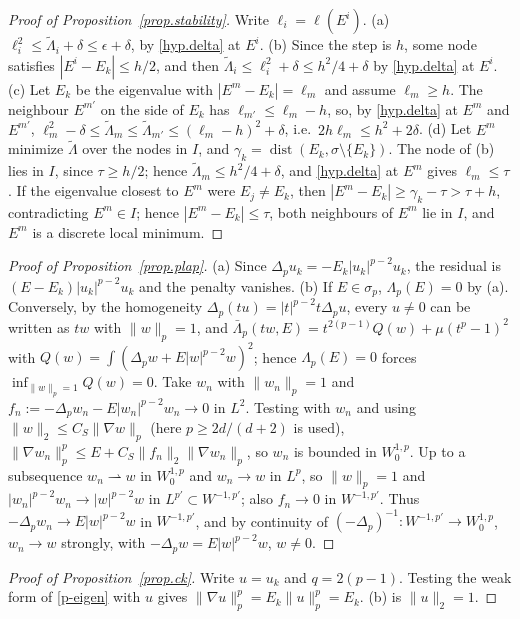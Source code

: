 \documentclass[10pt]{amsart}
\newenvironment{revblock}{\color{blue}}{}
\theoremstyle{definition}
\theoremstyle{remark}
\theoremstyle{plain}
\DeclareMathOperator{\dist}{dist}
\begin{document}
\begin{revblock}
\begin{proof}[Proof of Proposition~\ref{prop.stability}]
Write $\ell_i=\ell(E^i)$. (a) $\ell_i^2\le\tilde\Lambda_i+\delta\le\epsilon+\delta$, by \eqref{hyp.delta} at $E^i$. (b) Since the
step is $h$, some node satisfies $|E^i-E_k|\le h/2$, and then $\tilde\Lambda_i\le \ell_i^2+\delta\le h^2/4+\delta$ by
\eqref{hyp.delta} at $E^i$. (c) Let $E_k$ be the
eigenvalue with $|E^m-E_k|=\ell_m$ and assume $\ell_m\ge h$. The neighbour $E^{m'}$ on the side of $E_k$ has
$\ell_{m'}\le \ell_m-h$, so, by \eqref{hyp.delta} at $E^m$ and $E^{m'}$,
$\ell_m^2-\delta\le\tilde\Lambda_m\le\tilde\Lambda_{m'}\le(\ell_m-h)^2+\delta$, i.e.\
$2h\ell_m\le h^2+2\delta$. (d) Let $E^m$ minimize $\tilde\Lambda$ over
the nodes in $I$, and $\gamma_k=\dist(E_k,\sigma\setminus\{E_k\})$. The node of (b) lies in $I$, since
$\tau\ge h/2$; hence $\tilde\Lambda_m\le h^2/4+\delta$, and \eqref{hyp.delta} at $E^m$ gives $\ell_m\le\tau$. If the eigenvalue closest
to $E^m$ were $E_j\ne E_k$, then $|E^m-E_k|\ge\gamma_k-\tau>\tau+h$, contradicting $E^m\in I$; hence
$|E^m-E_k|\le\tau$, both neighbours of $E^m$ lie in $I$, and $E^m$ is a discrete local minimum.
\end{proof}

\begin{proof}[Proof of Proposition~\ref{prop.plap}]
(a) Since $\Delta_pu_k=-E_k|u_k|^{p-2}u_k$, the residual is $(E-E_k)|u_k|^{p-2}u_k$ and the penalty
vanishes. (b) If $E\in\sigma_p$, $\Lambda_p(E)=0$ by (a). Conversely, by the homogeneity
$\Delta_p(tu)=|t|^{p-2}t\Delta_pu$, every $u\ne0$ can be written as $tw$ with $\|w\|_p=1$, and
$\bar\Lambda_p(tw,E)=t^{2(p-1)}Q(w)+\mu(t^p-1)^2$ with $Q(w)=\int(\Delta_pw+E|w|^{p-2}w)^2$; hence
$\Lambda_p(E)=0$ forces $\inf_{\|w\|_p=1}Q(w)=0$. Take $w_n$ with $\|w_n\|_p=1$ and
$f_n:=-\Delta_pw_n-E|w_n|^{p-2}w_n\to0$ in $L^2$. Testing with $w_n$ and using
$\|w\|_2\le C_S\|\nabla w\|_p$ (here $p\ge2d/(d+2)$ is used),
$\|\nabla w_n\|_p^p\le E+C_S\|f_n\|_2\|\nabla w_n\|_p$, so $w_n$ is bounded in $W^{1,p}_0$. Up to a
subsequence $w_n\rightharpoonup w$ in $W^{1,p}_0$ and $w_n\to w$ in $L^p$, so $\|w\|_p=1$ and
$|w_n|^{p-2}w_n\to|w|^{p-2}w$ in $L^{p'}\subset W^{-1,p'}$; also $f_n\to0$ in $W^{-1,p'}$. Thus
$-\Delta_pw_n\to E|w|^{p-2}w$ in $W^{-1,p'}$, and by continuity of $(-\Delta_p)^{-1}\colon
W^{-1,p'}\to W^{1,p}_0$, $w_n\to w$ strongly, with $-\Delta_pw=E|w|^{p-2}w$, $w\ne0$.
\end{proof}

\begin{proof}[Proof of Proposition~\ref{prop.ck}]
Write $u=u_k$ and $q=2(p-1)$. Testing the weak form of \eqref{p-eigen} with $u$ gives
$\|\nabla u\|_p^p=E_k\|u\|_p^p=E_k$. (b) is $\|u\|_2=1$.


\end{proof}
\end{revblock}
\end{document}
